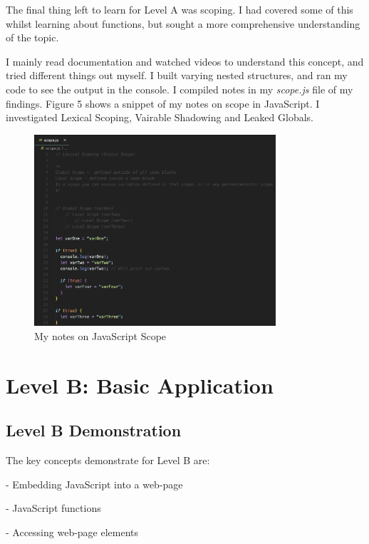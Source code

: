\documentclass[a4paper, 11pt]{report}
\begin{document}
The final thing left to learn for Level A was scoping. I had covered some of this whilst learning about functions, but sought a more comprehensive understanding of the topic. 

I mainly read documentation and watched videos to understand this concept, and tried different things out myself. I built varying nested structures, and ran my code to see the output in the console. I compiled notes in my \emph{scope.js} file of my findings. Figure 5 shows a snippet of my notes on scope in JavaScript. I investigated Lexical Scoping, Vairable Shadowing and Leaked Globals. 

\begin{figure}[ht]
    \centering
    \includegraphics[width=0.8\textwidth]{Images/scope.png}
    \caption{My notes on JavaScript Scope}
    \label{fig:screenshot}
\end{figure}


\newpage
\section{Level B: Basic Application}

\subsection{Level B Demonstration}

The key concepts demonstrate for Level B are:

- Embedding JavaScript into a web-page

- JavaScript functions

- Accessing web-page elements
\end{document}
